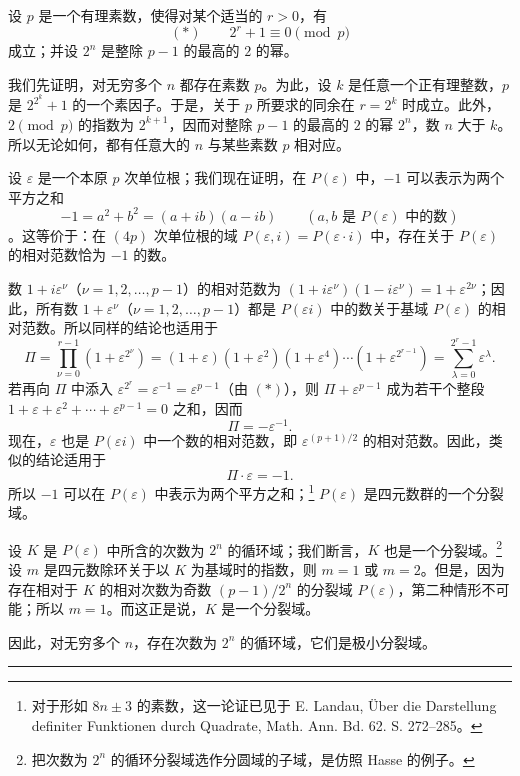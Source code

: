

设 $p$ 是一个有理素数，使得对某个适当的 $r>0$，有
\[
        (*)\qquad 2^r+1\equiv0\pmod p
\]
成立；并设 $2^n$ 是整除 $p-1$ 的最高的 $2$ 的幂。

我们先证明，对无穷多个 $n$ 都存在素数 $p$。为此，设 $k$ 是任意一个正有理整数，$p$ 是 $2^{2^k}+1$ 的一个素因子。于是，关于 $p$ 所要求的同余在 $r=2^k$ 时成立。此外，$2\pmod p$ 的指数为 $2^{k+1}$，因而对整除 $p-1$ 的最高的 $2$ 的幂 $2^n$，数 $n$ 大于 $k$。所以无论如何，都有任意大的 $n$ 与某些素数 $p$ 相对应。

设 $\varepsilon$ 是一个本原 $p$ 次单位根；我们现在证明，在 $P(\varepsilon)$ 中，$-1$ 可以表示为两个平方之和
\[
        -1=a^2+b^2=(a+ib)(a-ib)\qquad (a,b\text{ 是 }P(\varepsilon)\text{ 中的数})
\]
。这等价于：在 $(4p)$ 次单位根的域 $P(\varepsilon,i)=P(\varepsilon\cdot i)$ 中，存在关于 $P(\varepsilon)$ 的相对范数恰为 $-1$ 的数。

数 $1+i\varepsilon^\nu$（$\nu=1,2,\ldots,p-1$）的相对范数为 $(1+i\varepsilon^\nu)(1-i\varepsilon^\nu)=1+\varepsilon^{2\nu}$；因此，所有数 $1+\varepsilon^\nu$（$\nu=1,2,\ldots,p-1$）都是 $P(\varepsilon i)$ 中的数关于基域 $P(\varepsilon)$ 的相对范数。所以同样的结论也适用于
\[
\Pi=\prod_{\nu=0}^{r-1}(1+\varepsilon^{2^\nu})
=(1+\varepsilon)(1+\varepsilon^2)(1+\varepsilon^4)\cdots(1+\varepsilon^{2^{r-1}})
=\sum_{\lambda=0}^{2^r-1}\varepsilon^\lambda.
\]
若再向 $\Pi$ 中添入 $\varepsilon^{2^r}=\varepsilon^{-1}=\varepsilon^{p-1}$（由 $(*)$），则 $\Pi+\varepsilon^{p-1}$ 成为若干个整段 $1+\varepsilon+\varepsilon^2+\cdots+\varepsilon^{p-1}=0$ 之和，因而
\[
        \Pi=-\varepsilon^{-1}.
\]
现在，$\varepsilon$ 也是 $P(\varepsilon i)$ 中一个数的相对范数，即 $\varepsilon^{(p+1)/2}$ 的相对范数。因此，类似的结论适用于
\[
        \Pi\cdot\varepsilon=-1.
\]
所以 $-1$ 可以在 $P(\varepsilon)$ 中表示为两个平方之和；\footnote{对于形如 $8n\pm3$ 的素数，这一论证已见于 E. Landau, Über die Darstellung definiter Funktionen durch Quadrate, Math. Ann. Bd. 62. S. 272--285。} $P(\varepsilon)$ 是四元数群的一个分裂域。

设 $K$ 是 $P(\varepsilon)$ 中所含的次数为 $2^n$ 的循环域；我们断言，$K$ 也是一个分裂域。\footnote{把次数为 $2^n$ 的循环分裂域选作分圆域的子域，是仿照 Hasse 的例子。} 设 $m$ 是四元数除环关于以 $K$ 为基域时的指数，则 $m=1$ 或 $m=2$。但是，因为存在相对于 $K$ 的相对次数为奇数 $(p-1)/2^n$ 的分裂域 $P(\varepsilon)$，第二种情形不可能；所以 $m=1$。而这正是说，$K$ 是一个分裂域。

因此，对无穷多个 $n$，存在次数为 $2^n$ 的循环域，它们是极小分裂域。

\begin{center}
\rule{7em}{0.4pt}
\end{center}

\clearpage
\setcounter{footnote}{0}

